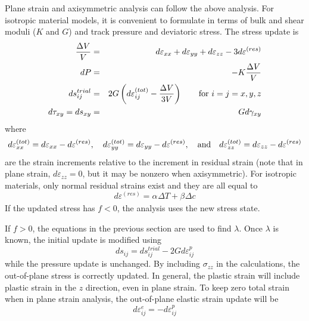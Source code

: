 \documentclass[11pt]{article}
\def\a#1{\alpha_{#1}}
\def\b#1{\beta_{#1}}
\def\DT{\Delta T}
\def\er#1{\varepsilon_{#1}^{(res)}}
\def\s#1{\sigma_{#1}}
\begin{document}
Plane strain and axisymmetric analysis can follow the above analysis. For isotropic material models, it is convenient to formulate in terms of bulk and shear moduli ($K$ and $G$) and track pressure and deviatoric stress. The stress update is
\begin{eqnarray}
       {\Delta V\over V} & = & d\varepsilon_{xx} + d\varepsilon_{yy} + d\varepsilon_{zz}  - 3d\er{} \\
       dP & = & -K {\Delta V\over V} \\
       ds_{ij}^{trial} & = & 2G \left(d\varepsilon_{ij}^{(tot)} - {\Delta V\over 3V}\right)   \qquad {\rm for\ }i=j=x,y,z\\
       d\tau_{xy} = ds_{xy} & = & G d\gamma_{xy} \\
\end{eqnarray}
where
\begin{equation}
      d\varepsilon_{xx}^{(tot)} = d\varepsilon_{xx} - d\er{}, \quad
      d\varepsilon_{yy}^{(tot)} = d\varepsilon_{yy} - d\er{}, \quad {\rm and}\quad
      d\varepsilon_{zz}^{(tot)} =  d\varepsilon_{zz} - d\er{}
\end{equation}
are the strain increments relative to the increment in residual strain (note that in plane strain, $ d\varepsilon_{zz}=0$, but it may be nonzero when axisymmetric). For isotropic materials, only normal residual strains exist and they are all equal to
\begin{equation}
      d\er{} = \a{}\DT + \b{}\Delta c
\end{equation}
If the updated stress has $f<0$, the analysis uses the new stress state.

If $f>0$, the equations in the previous section are used to find $\lambda$. Once $\lambda$ is known, the initial update is modified using
\begin{equation}
     ds_{ij} = ds_{ij}^{trial} - 2G d\varepsilon_{ij}^{p} 
\end{equation}
while the pressure update is unchanged.
By including $\s{zz}$ in the calculations, the out-of-plane stress is correctly updated. In general, the plastic strain will include plastic strain in the $z$ direction, even in plane strain. To keep zero total strain when in plane strain analysis, the out-of-plane elastic strain update will be
\begin{equation}
       d\varepsilon_{ij}^{e} = -d\varepsilon_{ij}^{p}  
\end{equation}
\end{document}
